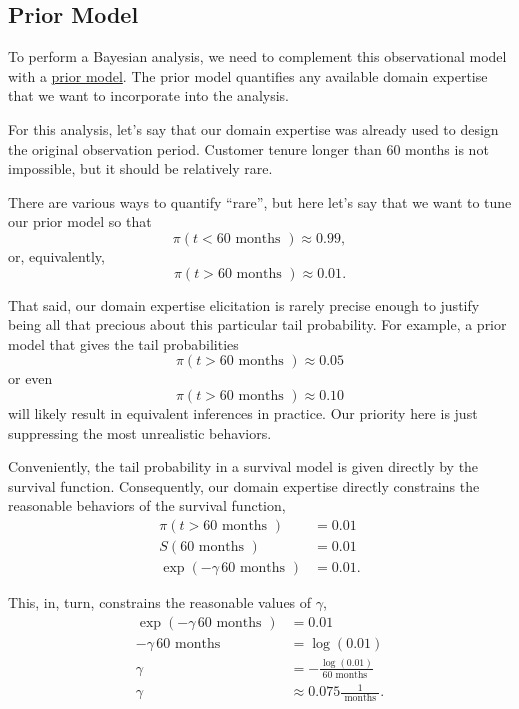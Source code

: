 \documentclass[
  letterpaper,
  DIV=11,
  numbers=noendperiod]{scrartcl}
\begin{document}
\subsection{Prior Model}\label{prior-model}

To perform a Bayesian analysis, we need to complement this observational
model with a
\href{http://www.symplectomorphic.com/assets/case_studies/prior_modeling.html}{prior
model}. The prior model quantifies any available domain expertise that
we want to incorporate into the analysis.

For this analysis, let's say that our domain expertise was already used
to design the original observation period. Customer tenure longer than
60 months is not impossible, but it should be relatively rare.

There are various ways to quantify ``rare'', but here let's say that we
want to tune our prior model so that \[
\pi( t < 60 \text{ months } ) \approx 0.99,
\] or, equivalently, \[
\pi( t > 60 \text{ months } ) \approx 0.01.
\]

That said, our domain expertise elicitation is rarely precise enough to
justify being all that precious about this particular tail probability.
For example, a prior model that gives the tail probabilities \[
\pi( t > 60 \text{ months } ) \approx 0.05
\] or even \[
\pi( t > 60 \text{ months } ) \approx 0.10
\] will likely result in equivalent inferences in practice. Our priority
here is just suppressing the most unrealistic behaviors.

Conveniently, the tail probability in a survival model is given directly
by the survival function. Consequently, our domain expertise directly
constrains the reasonable behaviors of the survival function,
\begin{align*}
\pi( t > 60 \text{ months } ) &= 0.01
\\
S( 60 \text{ months } ) &= 0.01
\\
\exp(- \gamma \, 60 \text{ months } ) &= 0.01.
\end{align*}

This, in, turn, constrains the reasonable values of \(\gamma\),
\begin{align*}
\exp(- \gamma \, 60 \text{ months } ) &= 0.01
\\
- \gamma \, 60 \text{ months } &= \log(0.01)
\\
\gamma &= - \frac{ \log(0.01) }{ 60 \text{ months } }
\\
\gamma &\approx 0.075 \frac{ 1 }{ \text{ months } }.
\end{align*}
\end{document}
